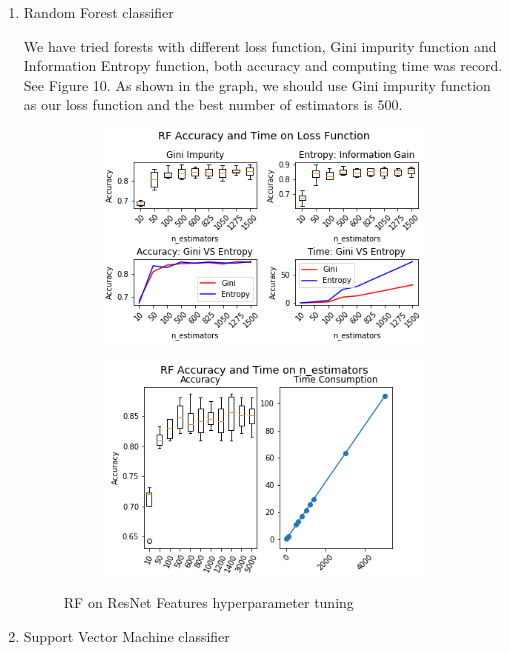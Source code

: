 \documentclass[11.5pt]{article}
\begin{document}
\begin{enumerate}
\begin{itemize}
\begin{enumerate}
                \item Random Forest classifier

                We have tried forests with different loss function, Gini impurity function and Information Entropy function, both accuracy and computing time was record. See Figure 10. As shown in the graph, we should use Gini impurity function as our loss function and the best number of estimators is $500$.

                \begin{figure}[h!]
                    \begin{subfigure}[b]{0.5\linewidth}
                        \centering
                        \includegraphics[width=0.7\linewidth]{images/res_tradi_RF_penalty.png}
                    \end{subfigure}
                    \begin{subfigure}[b]{0.5\linewidth}
                        \centering
                        \includegraphics[width=0.7\linewidth]{images/res_tradi_RF_n_estimators.png}
                    \end{subfigure}
                    \caption{RF on ResNet Features hyperparameter tuning}
                \end{figure}

                \item Support Vector Machine classifier


\end{enumerate}
\end{itemize}
\end{enumerate}
\end{document}
